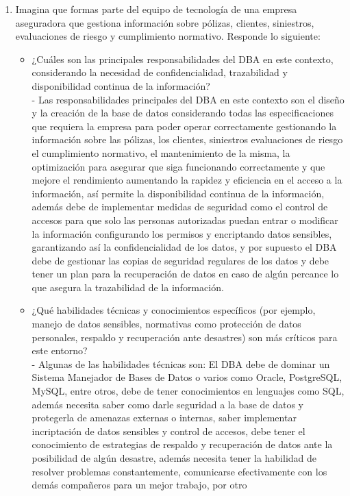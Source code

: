 \documentclass[12pt]{report}
\begin{document}
\begin{enumerate}[label=\textbf{\arabic*.}, leftmargin=*]
\begin{enumerate}[label=\textbf{\alph*.}, leftmargin=*, itemsep=1.0em]
\item Imagina que formas parte del equipo de tecnolog\'ia de una empresa aseguradora que gestiona informaci\'on sobre p\'olizas, clientes, siniestros, evaluaciones de riesgo y cumplimiento normativo. Responde lo siguiente:
\begin{itemize}
  \item ¿Cu\'ales son las principales responsabilidades del DBA en este contexto, considerando la necesidad de confidencialidad, trazabilidad y disponibilidad continua de la informaci\'on?\\
  - Las responsabilidades principales del DBA en este contexto son el diseño y la creación de la base de datos considerando todas las especificaciones que requiera la empresa para poder operar correctamente gestionando la información sobre las pólizas, los clientes, siniestros
  evaluaciones de riesgo el cumplimiento normativo, el mantenimiento de la misma, la optimización para asegurar que siga funcionando correctamente y que mejore el rendimiento aumentando la rapidez y eficiencia en el acceso a la información, así permite la disponibilidad continua de la información, además 
  debe de implementar medidas de seguridad como el control de accesos para que solo las personas autorizadas puedan entrar o modificar la información configurando los permisos y encriptando datos sensibles, garantizando así la confidencialidad de los datos, y por supuesto el DBA debe de gestionar las 
  copias de seguridad regulares de los datos y debe tener un plan para la recuperación de datos en caso de algún percance lo que asegura la trazabilidad de la información.
  \item ¿Qu\'e habilidades t\'ecnicas y conocimientos espec\'ificos (por ejemplo, manejo de datos sensibles, normativas como protecci\'on de datos personales, respaldo y recuperaci\'on ante desastres) son m\'as cr\'iticos para este entorno?\\
  - Algunas de las habilidades técnicas son: El DBA debe de dominar un Sistema Manejador de Bases de Datos o varios como Oracle, PostgreSQL, MySQL, entre otros, debe de tener conocimientos en lenguajes como SQL, además necesita saber como darle seguridad a la base de datos y protegerla de amenazas externas o internas,
  saber implementar incriptación de datos sensibles y control de accesos, debe tener el conocimiento de estrategias de respaldo y recuperación de datos ante la posibilidad de algún desastre, además necesita tener la habilidad de resolver problemas constantemente, comunicarse efectivamente con los demás compañeros para un mejor trabajo, por otro 

\end{itemize}
\end{enumerate}
\end{enumerate}
\end{document}
